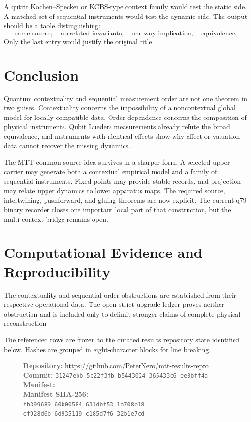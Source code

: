 \documentclass[11pt]{article}
\begin{document}
A qutrit Kochen--Specker or KCBS-type context family would test the static
side. A matched set of sequential instruments would test the dynamic side.
The output should be a table distinguishing:
\[
\text{same source},\quad
\text{correlated invariants},\quad
\text{one-way implication},\quad
\text{equivalence}.
\]
Only the last entry would justify the original title.

\section{Conclusion}

Quantum contextuality and sequential measurement order are not one theorem in
two guises. Contextuality concerns the impossibility of a noncontextual global
model for locally compatible data. Order dependence concerns the composition
of physical instruments. Qubit Lueders measurements already refute the broad
equivalence, and instruments with identical effects show why effect or
valuation data cannot recover the missing dynamics.

The MTT common-source idea survives in a sharper form. A selected upper carrier
may generate both a contextual empirical model and a family of sequential
instruments. Fixed points may provide stable records, and projection may
relate upper dynamics to lower apparatus maps. The required source,
intertwining, pushforward, and gluing theorems are now explicit. The current
q79 binary recorder closes one important local part of that construction, but
the multi-context bridge remains open.

\section*{Computational Evidence and Reproducibility}
The contextuality and sequential-order obstructions are established from their respective operational data. The open strict-upgrade ledger proves neither obstruction and is included only to delimit stronger claims of complete physical reconstruction.

The referenced rows are frozen to the curated results repository state identified below. Hashes are grouped in eight-character blocks for line breaking.
\begin{quote}\small
\textbf{Repository:} \url{https://github.com/PeterNero/mtt-results-repro}\\
\textbf{Commit:} \texttt{31247ebb 5c22f3fb b5443024 365433c6 ee0bff4a}\\
\textbf{Manifest:} \\
\textbf{Manifest SHA-256:}\\
\texttt{fb399689 60b00584 631dbf53 1a708e18}\\
\texttt{ef928d6b 6d935119 c185d7f6 32b1e7cd}
\end{quote}
\end{document}
